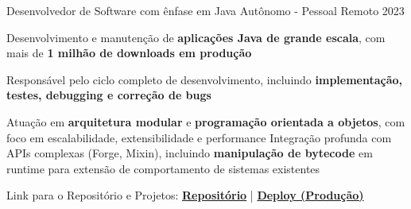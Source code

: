 

\begin{cventries}

  \cventry
    {Desenvolvedor de Software com ênfase em Java} %
    {Autônomo - Pessoal} %
    {Remoto} %
    {2023} %
    {
      \begin{cvitems} %
	\item {Desenvolvimento e manutenção de \textbf{aplicações Java de grande escala}, com mais de \textbf{1 milhão de downloads em produção}}
	\item {Responsável pelo ciclo completo de desenvolvimento, incluindo \textbf{implementação, testes, debugging e correção de bugs}}
	\item {Atuação em \textbf{arquitetura modular} e \textbf{programação orientada a objetos}, com foco em escalabilidade, extensibilidade e performance Integração profunda com APIs complexas (Forge, Mixin), incluindo \textbf{manipulação de bytecode} em runtime para extensão de comportamento de sistemas existentes}
	\item {Link para o Repositório e Projetos: \href{https://github.com/SobralCybersec/JujutsuKaisenUltimateReworked}{\textbf{Repositório}} | \href{https://www.curseforge.com/members/satuxhi/projects}{\textbf{Deploy (Produção)}}}
      \end{cvitems}
    }


\end{cventries}
